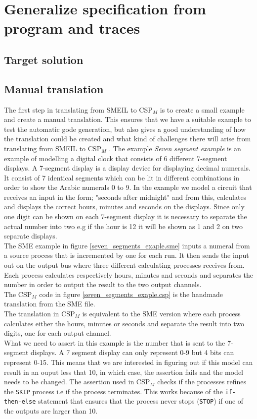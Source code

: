\documentclass[a4paper]{report}
\newcommand{\cspm}{CSP$_M$ }
\begin{document}
\chapter{Generalize specification from program and traces}
\section{Target solution}
\section{Manual translation}
The first step in translating from SMEIL to \cspm is to create a small example and create a manual translation. This ensures that we have a suitable example to test the automatic gode generation, but also gives a good understanding of how the translation could be created and what kind of challenges there will arise from translating from SMEIL to \cspm. 
The example \textit{Seven segment example} is an example of modelling a digital clock that consists of 6 different 7-segment displays. A 7-segment display is a display device for displaying decimal numerals. It consist of 7 identical segments which can be lit in different combinations in order to show the Arabic numerals 0 to 9. In the example we model a circuit that receives an input in the form; "seconds after midnight" and from this, calculates and displays the correct hours, minutes and seconds on the displays. Since only one digit can be shown on each 7-segment display it is necessary to separate the actual number into two e.g if the hour is 12 it will be shown as 1 and 2 on two separate displays. \\ The SME example in figure \ref{seven_segments_exaple.sme} inputs a numeral from a source process that is incremented by one for each run. It then sends the input out on the output bus where three different calculating processes receives from. Each process calculates respectively hours, minutes and seconds and separates the number in order to output the result to the two output channels. \\ The \cspm code in figure \ref{seven_segments_exaple.csp} is the handmade translation from the SME file. \\ The translation in \cspm is equivalent to the SME version where each process calculates either the hours, minutes or seconds and separate the result into two digits, one for each output channel.\\ 
What we need to assert in this example is the number that is sent to the 7-segment displays. A 7 segment display can only represent 0-9 but 4 bits can represent 0-15. This means that we are interested in figuring out if this model can result in an ouput less that 10, in which case, the assertion fails and the model needs to be changed. The assertion used in \cspm checks if the processes refines the \texttt{SKIP} process i.e if the process terminates. This works because of the \texttt{if-then-else} statement that ensures that the process never stops (\texttt{STOP}) if one of the outputs are larger than 10. \\\\ 
\end{document}
